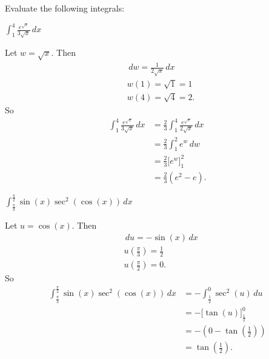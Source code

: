 \documentclass[nooutcomes]{ximera}
\renewcommand{\d}{\,d}
\newcommand{\eval}[1]{\bigg[ #1 \bigg]}
\renewenvironment{freeResponse}{
\ifhandout\setbox0\vbox\bgroup\else
\begin{trivlist}\item[\hskip \labelsep\bfseries Solution:\hspace{2ex}]
\fi}
{\ifhandout\egroup\else
\end{trivlist}
\fi}
\begin{document}
\begin{problem}
Evaluate the following integrals:

	\begin{enumerate}
	
	\item  $\int_1^4 \frac{e^{\sqrt{x}}}{3\sqrt{x}} \d x$
		\begin{freeResponse}
		Let $w=\sqrt{x}$.  Then
			\begin{align*}
			&\d w = \frac{1}{2 \sqrt{x}} \d x  \\
			&w(1) = \sqrt{1} = 1  \\
			&w(4) = \sqrt{4} = 2.
			\end{align*}
		So
			\begin{align*}
			\int_1^4 \frac{e^{\sqrt{x}}}{3\sqrt{x}} \d x &= \frac{2}{3} \int_1^4 \frac{e^{\sqrt{x}}}{2\sqrt{x}} \d x  \\
			&= \frac{2}{3} \int_1^2 e^w \d w  \\
			&= \frac{2}{3} \eval{e^w}_1^2  \\
			&= \frac{2}{3} (e^2 - e).
			\end{align*}
		\end{freeResponse}
		
		
		
	\item  $\int_{\frac{\pi}{3}}^{\frac{\pi}{2}} \sin(x) \sec^2(\cos(x)) \d x$
		\begin{freeResponse}
		Let $u=\cos(x)$.  Then
			\begin{align*}
			&\d u = -\sin(x) \d x  \\
			&u\left( \frac{\pi}{3} \right) = \frac{1}{2}  \\
			&u\left( \frac{\pi}{2} \right) = 0.
			\end{align*}
		So
			\begin{align*}
			\int_{\frac{\pi}{3}}^{\frac{\pi}{2}} \sin(x) \sec^2(\cos(x)) \d x &= - \int_{\frac{1}{2}}^0 \sec^2(u) \d u   \\
			&= - \eval{\tan(u)}_{\frac{1}{2}}^0  \\
			&=  -\left( 0 - \tan\left( \frac{1}{2} \right) \right)  \\
			&= \tan \left( \frac{1}{2} \right).
			\end{align*}
		\end{freeResponse}
		
		
		
	\end{enumerate}
			
			
	
\end{problem}
\end{document}
